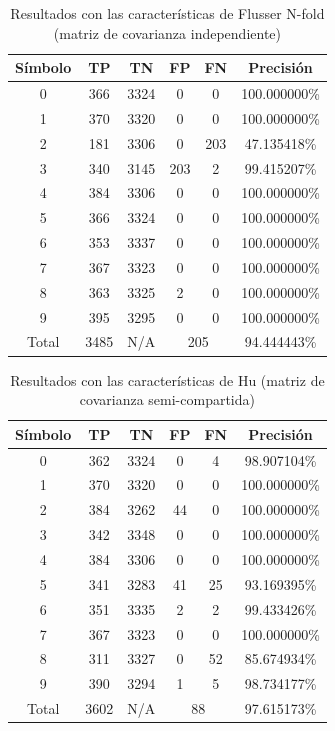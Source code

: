 \documentclass[a4paper, 11pt, oneside]{report}
\begin{document}
\begin{table}
\centering
\begin{tabular}{|c|c|c|c|c|c|}
	\hline
	Símbolo & TP & TN & FP & FN & Precisión \\ 
	\hline
	0 & 366 & 3324 & 0 & 0 & 100.000000\% \\ 
	1 & 370 & 3320 & 0 & 0 & 100.000000\% \\ 
	2 & 181 & 3306 & 0 & 203 & 47.135418\% \\ 
	3 & 340 & 3145 & 203 & 2 & 99.415207\% \\ 
	4 & 384 & 3306 & 0 & 0 & 100.000000\% \\ 
	5 & 366 & 3324 & 0 & 0 & 100.000000\% \\ 
	6 & 353 & 3337 & 0 & 0 & 100.000000\% \\ 
	7 & 367 & 3323 & 0 & 0 & 100.000000\% \\ 
	8 & 363 & 3325 & 2 & 0 & 100.000000\% \\ 
	9 & 395 & 3295 & 0 & 0 & 100.000000\% \\ 
	\hline
	Total & 3485 & N/A & \multicolumn{2}{|c|}{205} & 94.444443\% \\
	\hline
\end{tabular}
\caption{Resultados con las características de Flusser N-fold (matriz de covarianza independiente)}
\label{tb:numRotIndep}
\end{table}

\begin{table}
\centering
\begin{tabular}{|c|c|c|c|c|c|}
	\hline
	Símbolo & TP & TN & FP & FN & Precisión \\ 
	\hline
	0 & 362 & 3324 & 0 & 4 & 98.907104\% \\ 
	1 & 370 & 3320 & 0 & 0 & 100.000000\% \\ 
	2 & 384 & 3262 & 44 & 0 & 100.000000\% \\ 
	3 & 342 & 3348 & 0 & 0 & 100.000000\% \\ 
	4 & 384 & 3306 & 0 & 0 & 100.000000\% \\ 
	5 & 341 & 3283 & 41 & 25 & 93.169395\% \\ 
	6 & 351 & 3335 & 2 & 2 & 99.433426\% \\ 
	7 & 367 & 3323 & 0 & 0 & 100.000000\% \\ 
	8 & 311 & 3327 & 0 & 52 & 85.674934\% \\ 
	9 & 390 & 3294 & 1 & 5 & 98.734177\% \\ 
	\hline
	Total & 3602 & N/A & \multicolumn{2}{|c|}{88} & 97.615173\% \\
	\hline
\end{tabular}
\caption{Resultados con las características de Hu (matriz de covarianza semi-compartida)}
\label{tb:numHuShared}
\end{table}
\end{document}
